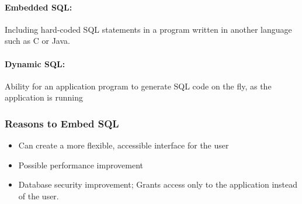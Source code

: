 \documentclass[12pt]{article}
\begin{document}
\paragraph{Embedded SQL:} Including hard-coded SQL statements in a program written in another language such as C or Java.

\paragraph{Dynamic SQL:} Ability for an application program to generate SQL code on the fly, as the application is running

\subsubsection{Reasons to Embed SQL}

\begin{itemize}
	\item{Can create a more flexible, accessible interface for the user}
	\item{Possible performance improvement}
	\item{Database security improvement; Grants access only to the application instead of the user.}
\end{itemize}
\end{document}
